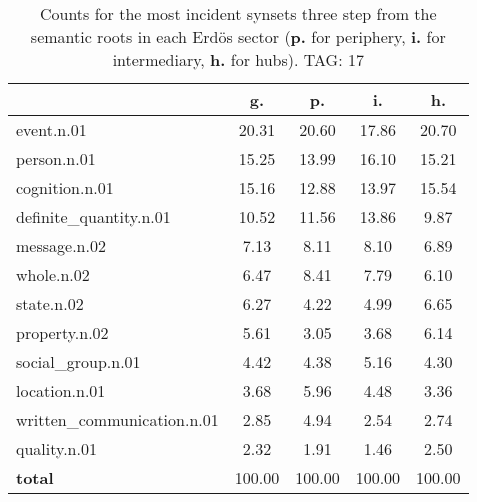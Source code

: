 \begin{table}[h!]
\begin{center}
\begin{tabular}{| l || c | c | c | c |}\hline
 & {\bf g.} & {\bf p.} & {\bf i.} & {\bf h.} \\\hline\hline
event.n.01 & 20.31  & 20.60  & 17.86  & 20.70 \\\hline
person.n.01 & 15.25  & 13.99  & 16.10  & 15.21 \\\hline
cognition.n.01 & 15.16  & 12.88  & 13.97  & 15.54 \\\hline
definite\_quantity.n.01 & 10.52  & 11.56  & 13.86  & 9.87 \\\hline
message.n.02 & 7.13  & 8.11  & 8.10  & 6.89 \\\hline
whole.n.02 & 6.47  & 8.41  & 7.79  & 6.10 \\\hline
state.n.02 & 6.27  & 4.22  & 4.99  & 6.65 \\\hline
property.n.02 & 5.61  & 3.05  & 3.68  & 6.14 \\\hline
social\_group.n.01 & 4.42  & 4.38  & 5.16  & 4.30 \\\hline
location.n.01 & 3.68  & 5.96  & 4.48  & 3.36 \\\hline
written\_communication.n.01 & 2.85  & 4.94  & 2.54  & 2.74 \\\hline
quality.n.01 & 2.32  & 1.91  & 1.46  & 2.50 \\\hline\hline
{{\bf total}} & 100.00  & 100.00  & 100.00  & 100.00 \\\hline
\end{tabular}
\caption{Counts for the most incident synsets three step from the semantic roots in each Erd\"os sector ({\bf p.} for periphery, {\bf i.} for intermediary, {\bf h.} for hubs). TAG: 17}
\end{center}
\end{table}